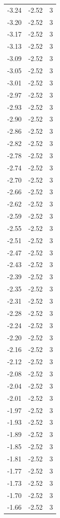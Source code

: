 \begin{longtable}{lrr}
  -3.24 & -2.52 & 3 \\
  -3.20 & -2.52 & 3 \\
  -3.17 & -2.52 & 3 \\
  -3.13 & -2.52 & 3 \\
  -3.09 & -2.52 & 3 \\
  -3.05 & -2.52 & 3 \\
  -3.01 & -2.52 & 3 \\
  -2.97 & -2.52 & 3 \\
  -2.93 & -2.52 & 3 \\
  -2.90 & -2.52 & 3 \\
  -2.86 & -2.52 & 3 \\
  -2.82 & -2.52 & 3 \\
  -2.78 & -2.52 & 3 \\
  -2.74 & -2.52 & 3 \\
  -2.70 & -2.52 & 3 \\
  -2.66 & -2.52 & 3 \\
  -2.62 & -2.52 & 3 \\
  -2.59 & -2.52 & 3 \\
  -2.55 & -2.52 & 3 \\
  -2.51 & -2.52 & 3 \\
  -2.47 & -2.52 & 3 \\
  -2.43 & -2.52 & 3 \\
  -2.39 & -2.52 & 3 \\
  -2.35 & -2.52 & 3 \\
  -2.31 & -2.52 & 3 \\
  -2.28 & -2.52 & 3 \\
  -2.24 & -2.52 & 3 \\
  -2.20 & -2.52 & 3 \\
  -2.16 & -2.52 & 3 \\
  -2.12 & -2.52 & 3 \\
  -2.08 & -2.52 & 3 \\
  -2.04 & -2.52 & 3 \\
  -2.01 & -2.52 & 3 \\
  -1.97 & -2.52 & 3 \\
  -1.93 & -2.52 & 3 \\
  -1.89 & -2.52 & 3 \\
  -1.85 & -2.52 & 3 \\
  -1.81 & -2.52 & 3 \\
  -1.77 & -2.52 & 3 \\
  -1.73 & -2.52 & 3 \\
  -1.70 & -2.52 & 3 \\
  -1.66 & -2.52 & 3 \\

\end{longtable}
